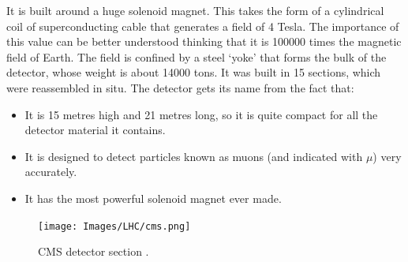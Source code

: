 It is built around a huge solenoid magnet. This takes the form of a cylindrical coil of superconducting cable that generates a field of 4 Tesla. The importance of this value can be better understood thinking that it is 100000 times the magnetic field of Earth. The field is confined by a steel `yoke' that forms the bulk of the detector, whose weight is about 14000 tons. It was built in 15 sections, which were reassembled in situ. The detector gets its name from the fact that:
\begin{itemize}
	\item It is 15 metres high and 21 metres long, so it is quite compact for all the detector material it contains.
	\item It is designed to detect particles known as muons (and indicated with $\mu$) very accurately.
	\item It has the most powerful solenoid magnet ever made.
\end{itemize}

\begin{figure}[t]
	\begin{center}
		\texttt{[image: Images/LHC/cms.png]}
		\caption{CMS detector section \cite{cms}.}
		\label{fig:CMS_SECTION}
	\end{center}
\end{figure}

